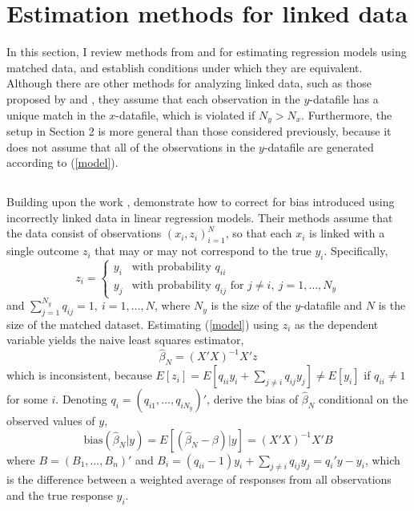 \documentclass[12pt]{article}
\begin{document}
\section{Estimation methods for linked data }

In this section, I review methods from \cite{sw1993} and \citet*{ahl2019} for estimating regression models using matched data, and establish conditions under which they are equivalent.   Although there are other methods for analyzing linked data, such as those proposed by \citet*{lahiri05} and \citet*{Goldstein2012}, they assume that each observation in the $y$-datafile has a unique match in the $x$-datafile, which is violated if $N_y > N_x$.  Furthermore, the setup in Section 2 is more general than those considered previously, because it does not assume that all of the observations in the $y$-datafile are generated according to (\ref{model}).  

\subsection{\cite{sw1993}}

Building upon the work \citet*{NeterMaynes}, \cite{sw1993} demonstrate how to correct for bias introduced using incorrectly linked data in linear regression models.  Their methods assume that the data consist of observations $(x_i,z_i)_{i=1}^N$, so that each $x_i$ is linked with a single outcome $z_i$ that may or may not correspond to the true $y_i$.  Specifically, 
$$z_i = \begin{cases} y_i & \text{with probability $q_{ii}$} \\ y_j & \text{with probability $q_{ij}$ for $j\neq i,\ j = 1,\dots,N_y $} \end{cases}$$ 
and $\sum_{j=1}^{N_y} q_{ij} = 1, \ i=1,\dots, N$, where $N_y$ is the size of the $y$-datafile and $N$ is the size of the matched dataset.   Estimating (\ref{model}) using $z_i$ as the dependent variable yields the naive least squares estimator, 
\begin{equation} \hat{\beta}_N = (X'X)^{-1} X'z \label{naive} \end{equation}
which is inconsistent, because $ E[z_i ] = E\left[q_{ii} y_i + \sum_{j\neq i} q_{ij} y_j\right] \neq E[y_i]$ if $q_{ii}\neq 1$ for some $i$.  Denoting
 $q_i = (q_{i1}, \dots, q_{iN_y})'$, \cite{sw1993} derive the bias of $\hat{\beta}_N $ conditional on the observed values of $y$,
\begin{equation} \text{bias} (\hat{\beta}_N | y) = E[(\hat{\beta}_N - \beta) | y ] = (X'X)^{-1} X'B \label{bias} \end{equation}
where $B = (B_1, \dots, B_n)'$ and $B_i = (q_{ii}-1)y_i + \sum_{j\neq i } q_{ij} y_j = q_i'y - y_i$, which is the difference between a weighted average of responses from all observations and the true response $y_i$.  
\end{document}
